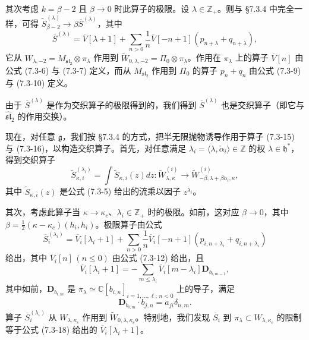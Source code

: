 其次考虑 $k=\beta-2$ 且 $\beta\to0$ 时此算子的极限。设 $\lambda\in\mathbb{Z}_+$。则与 §7.3.4 中完全一样，可得 $\widetilde{S}^{(\lambda)}_{\beta-2}\to\beta\overline{S}^{(\lambda)}$，其中
\begin{equation}
    \overline{S}^{(\lambda)}=\overline{V}[\lambda+1]+\sum_{n>0}\frac{1}{n}\overline{V}[-n+1](p_{n+\lambda}+q_{n+\lambda}),
    \tag{7.3-16}
\end{equation}
它从 $W_{\lambda,-2}=M_{\mathfrak{sl}_2}\otimes\pi_\lambda$ 作用到 $\widetilde{W}_{0,\lambda,-2}=\Pi_0\otimes\pi_\lambda$。作用在 $\pi_\lambda$ 上的算子 $\overline{V}[n]$ 由公式 (7.3-6) 与 (7.3-7) 定义，而从 $M_{\mathfrak{sl}_2}$ 作用到 $\Pi_0$ 的算子 $p_n+q_n$ 由公式 (7.3-9) 与 (7.3-10) 定义。

由于 $\overline{S}^{(\lambda)}$ 是作为交织算子的极限得到的，我们得到 $\overline{S}^{(\lambda)}$ 也是交织算子（即它与 $\widehat{\mathfrak{sl}}_2$ 的作用交换）。

现在，对任意 $\mathfrak{g}$，我们按 §7.3.4 的方式，把半无限抛物诱导作用于算子 (7.3-15) 与 (7.3-16)，以构造交织算子。首先，对任意满足 $\lambda_i=\langle\lambda,\check{\alpha}_i\rangle\in\mathbb{Z}$ 的权 $\lambda\in\mathfrak{h}^*$，得到交织算子
\[
    \widetilde{S}^{(\lambda_i)}_{\kappa,i}=\int\widetilde{S}_{\kappa,i}(z)dz:
    \widetilde{W}_{\lambda,\kappa}^{(i)}\longrightarrow\widetilde{W}_{-\beta,\lambda+\beta\check{\alpha}_i,\kappa}^{(i)},
\]
其中 $\widetilde{S}_{\kappa,i}(z)$ 是公式 (7.3-5) 给出的流乘以因子 $z^{\lambda_i}$。

其次，考虑此算子当 $\kappa\to\kappa_c$、$\lambda_i\in\mathbb{Z}_+$ 时的极限。如前，这对应 $\beta\to0$，其中 $\beta=\frac{1}{2}(\kappa-\kappa_c)(h_i,h_i)$。极限算子由公式
\begin{equation}
    \overline{S}^{(\lambda_i)}_i=\overline{V}_i[\lambda_i+1]+\sum_{n>0}\frac{1}{n}\overline{V}_i[-n+1](p_{i,n+\lambda_i}+q_{i,n+\lambda_i})
    \tag{7.3-17}
\end{equation}
给出，其中 $\overline{V}_i[n]\,(n\le0)$ 由公式 (7.3-12) 给出，且
\begin{equation}
    \overline{V}_i[\lambda_i+1]=-\sum_{m\le\lambda_i}\overline{V}_i[m-\lambda_i]\mathbf{D}_{b_{i,m-1}},
    \tag{7.3-18}
\end{equation}
其中如前，$\mathbf{D}_{b_{i,m}}$ 是 $\pi_\lambda\simeq\mathbb{C}[b_{i,n}]_{i=1,\dots,\ell;\,n<0}$ 上的导子，满足
\[
    \mathbf{D}_{b_{i,m}}\cdot b_{j,n}=a_{ji}\delta_{n,m}.
\]
算子 $\overline{S}^{(\lambda_i)}_i$ 从 $W_{\lambda,\kappa_c}$ 作用到 $\widetilde{W}_{0,\lambda,\kappa_c}$。特别地，我们发现 $\overline{S}_i$ 到 $\pi_\lambda\subset W_{\lambda,\kappa_c}$ 的限制等于公式 (7.3-18) 给出的 $\overline{V}_i[\lambda_i+1]$。

